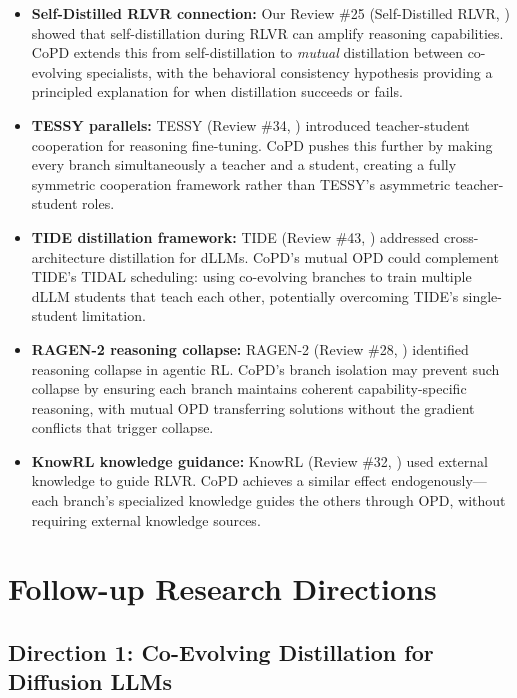 \documentclass[11pt]{article}
\begin{document}
\begin{itemize}
    \item \textbf{Self-Distilled RLVR connection:} Our Review \#25 (Self-Distilled RLVR, \cite{sdrlvr}) showed that self-distillation during RLVR can amplify reasoning capabilities. CoPD extends this from self-distillation to \emph{mutual} distillation between co-evolving specialists, with the behavioral consistency hypothesis providing a principled explanation for when distillation succeeds or fails.
    \item \textbf{TESSY parallels:} TESSY (Review \#34, \cite{tessy}) introduced teacher-student cooperation for reasoning fine-tuning. CoPD pushes this further by making every branch simultaneously a teacher and a student, creating a fully symmetric cooperation framework rather than TESSY's asymmetric teacher-student roles.
    \item \textbf{TIDE distillation framework:} TIDE (Review \#43, \cite{tide}) addressed cross-architecture distillation for dLLMs. CoPD's mutual OPD could complement TIDE's TIDAL scheduling: using co-evolving branches to train multiple dLLM students that teach each other, potentially overcoming TIDE's single-student limitation.
    \item \textbf{RAGEN-2 reasoning collapse:} RAGEN-2 (Review \#28, \cite{ragen2}) identified reasoning collapse in agentic RL. CoPD's branch isolation may prevent such collapse by ensuring each branch maintains coherent capability-specific reasoning, with mutual OPD transferring solutions without the gradient conflicts that trigger collapse.
    \item \textbf{KnowRL knowledge guidance:} KnowRL (Review \#32, \cite{knowrl}) used external knowledge to guide RLVR. CoPD achieves a similar effect endogenously---each branch's specialized knowledge guides the others through OPD, without requiring external knowledge sources.
\end{itemize}

\section{Follow-up Research Directions}

\subsection{Direction 1: Co-Evolving Distillation for Diffusion LLMs}
\end{document}
